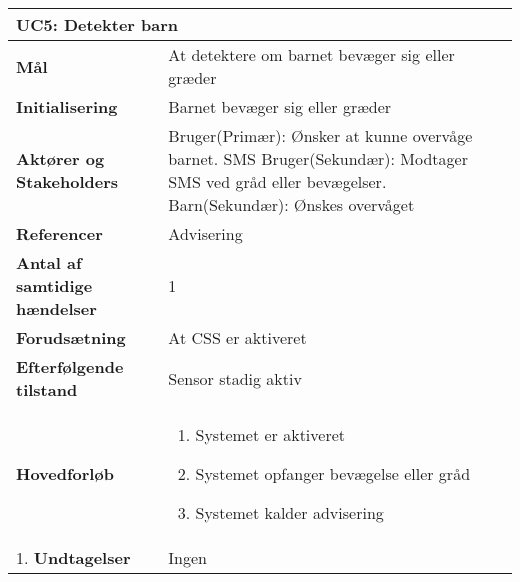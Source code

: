 \begin{table}[H] \centering
\begin{tabular}{|p{6cm}|p{8cm}|}
	\hline
\multicolumn{2}{|l|}{\textbf{UC5: Detekter barn}} \\\hline
\textbf{Mål}								&At detektere om barnet bevæger sig eller græder \\\hline
\textbf{Initialisering}					&Barnet bevæger sig eller græder\\\hline
\textbf{Aktører og Stakeholders}			&Bruger(Primær): Ønsker at kunne overvåge barnet. SMS Bruger(Sekundær): 																	Modtager SMS ved gråd eller bevægelser. Barn(Sekundær): Ønskes overvåget 				 \\\hline
\textbf{Referencer}						&Advisering \\\hline
\textbf{Antal af samtidige hændelser}	&1 \\\hline
\textbf{Forudsætning}					&At CSS er aktiveret \\\hline
\textbf{Efterfølgende tilstand}			&Sensor stadig aktiv \\\hline
\textbf{Hovedforløb}						&\begin{enumerate}
	
				\item Systemet er aktiveret
												
				\item Systemet opfanger bevægelse eller gråd
												
				\item Systemet kalder advisering
								
			\end{enumerate}\\\hline1.
\textbf{Undtagelser}					&Ingen \\\hline
	\end{tabular}
	\label{UC5} 
\end{table}